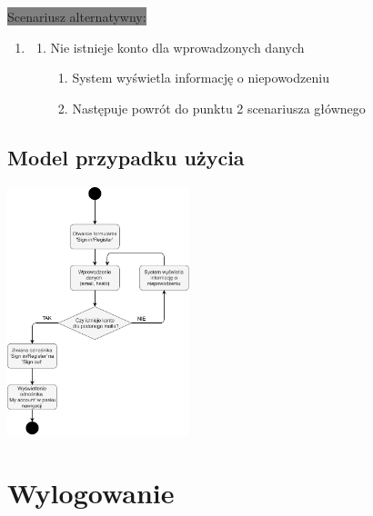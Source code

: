 \documentclass[10pt]{report}
\begin{document}
			\colorbox{grey}{Scenariusz alternatywny:}
			\begin{enumerate}\addtocounter{enumi}{3}
				\item[]
				\begin{enumerate}
					\item Nie istnieje konto dla wprowadzonych danych
					\begin{enumerate}
						\item System wyświetla informację o niepowodzeniu
						\item Następuje powrót do punktu 2 scenariusza głównego
					\end{enumerate}
				\end{enumerate}
			\end{enumerate}
		
		\subsection{Model przypadku użycia}
			\begin{center}
				\includegraphics[width=150pt]{logowanie.pdf}
			\end{center}
			 

		
	\section{Wylogowanie}
	
	
\end{document}
